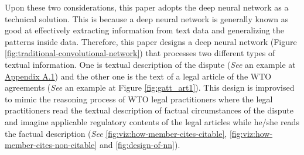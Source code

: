 Upon these two considerations, this paper adopts the deep neural network as a technical solution. %
This is because a deep neural network is generally known as good at effectively extracting information from text data and generalizing the patterns inside data. 
Therefore, this paper designs a deep neural network (Figure \ref{fig:traditional-convolutional-network}) that
processes two different types of textual information.
One is textual description of the dispute (\textit{See} an example at \hyperref[sub:factual-aspect-example]{Appendix A.1}) and
the other one is the text of a legal article of the WTO agreements (\textit{See} an example at Figure \ref{fig:gatt_art1}).
This design is improvised to mimic
the reasoning process of WTO legal practitioners
where the legal practitioners read
the textual description of
factual circumstances of the dispute and imagine applicable regulatory contents of
the legal articles while he/she reads the factual description (\textit{See} \ref{fig:viz:how-member-cites-citable}, \ref{fig:viz:how-member-cites-non-citable} and \ref{fig:design-of-nn}).






